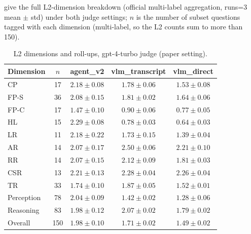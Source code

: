  give the full L2-dimension breakdown (official
multi-label aggregation, runs=3 mean $\pm$ std) under both judge settings; $n$ is
the number of subset questions tagged with each dimension (multi-label, so the
L2 counts sum to more than 150).

\begin{table}[h]
  \centering
  \small
  \caption{L2 dimensions and roll-ups, gpt-4-turbo judge (paper setting).}
  \label{tab:l2gpt}
  \begin{tabular}{@{}lcccc@{}}
    \toprule
    Dimension & $n$ & agent\_v2 & vlm\_transcript & vlm\_direct \\
    \midrule
    CP & 17 & $2.18 \pm 0.08$ & $1.78 \pm 0.06$ & $1.53 \pm 0.08$ \\
    FP-S & 36 & $2.08 \pm 0.15$ & $1.81 \pm 0.02$ & $1.64 \pm 0.06$ \\
    FP-C & 17 & $1.47 \pm 0.10$ & $0.90 \pm 0.06$ & $0.77 \pm 0.05$ \\
    HL & 15 & $2.29 \pm 0.08$ & $0.78 \pm 0.03$ & $0.64 \pm 0.03$ \\
    LR & 11 & $2.18 \pm 0.22$ & $1.73 \pm 0.15$ & $1.39 \pm 0.04$ \\
    AR & 14 & $2.07 \pm 0.17$ & $2.50 \pm 0.06$ & $2.21 \pm 0.10$ \\
    RR & 14 & $2.07 \pm 0.15$ & $2.12 \pm 0.09$ & $1.81 \pm 0.03$ \\
    CSR & 13 & $2.21 \pm 0.13$ & $2.28 \pm 0.04$ & $2.26 \pm 0.04$ \\
    TR & 33 & $1.74 \pm 0.10$ & $1.87 \pm 0.05$ & $1.52 \pm 0.01$ \\
    \midrule
    Perception & 78 & $2.04 \pm 0.09$ & $1.42 \pm 0.02$ & $1.28 \pm 0.06$ \\
    Reasoning & 83 & $1.98 \pm 0.12$ & $2.07 \pm 0.02$ & $1.79 \pm 0.02$ \\
    Overall & 150 & $1.98 \pm 0.10$ & $1.71 \pm 0.02$ & $1.49 \pm 0.02$ \\
    \bottomrule
  \end{tabular}
\end{table}

